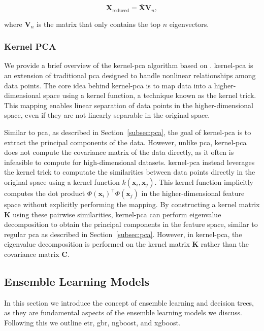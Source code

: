 $$
\mathbf{X}_{\text{reduced}} = \mathbf{\bar{X}} \mathbf{V}_n,
$$

where $\mathbf{V}_n$ is the matrix that only contains the top $n$ eigenvectors.

\subsubsection{Kernel PCA}
We provide a brief overview of the \gls{kernel-pca} algorithm based on \citet{learningwithkernels}.
\gls{kernel-pca} is an extension of traditional \gls{pca} designed to handle nonlinear relationships among data points.
The core idea behind \gls{kernel-pca} is to map data into a higher-dimensional space using a kernel function, a technique known as the kernel trick.
This mapping enables linear separation of data points in the higher-dimensional space, even if they are not linearly separable in the original space.

Similar to \gls{pca}, as described in Section~\ref{subsec:pca}, the goal of \gls{kernel-pca} is to extract the principal components of the data.
However, unlike \gls{pca}, \gls{kernel-pca} does not compute the covariance matrix of the data directly, as it often is infeasible to compute for high-dimensional datasets.
\gls{kernel-pca} instead leverages the kernel trick to computate the similarities between data points directly in the original space using a kernel function $k(\mathbf{x}_i, \mathbf{x}_j)$.
This kernel function implicitly computes the dot product $\Phi(\mathbf{x}_i)^\top \Phi(\mathbf{x}_j)$ in the higher-dimensional feature space without explicitly performing the mapping.
By constructing a kernel matrix $\mathbf{K}$ using these pairwise similarities, \gls{kernel-pca} can perform eigenvalue decomposition to obtain the principal components in the feature space, similar to regular \gls{pca} as described in Section~\ref{subsec:pca}.
However, in \gls{kernel-pca}, the eigenvalue decomposition is performed on the kernel matrix $\mathbf{K}$ rather than the covariance matrix $\mathbf{C}$.

\subsection{Ensemble Learning Models}
In this section we introduce the concept of ensemble learning and decision trees, as they are fundamental aspects of the ensemble learning models we discuss.
Following this we outline \gls{etr}, \gls{gbr}, \gls{ngboost}, and \gls{xgboost}.


